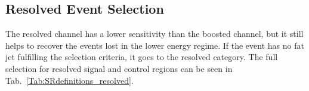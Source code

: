 \subsection{Resolved Event Selection}
The resolved channel has a lower sensitivity than the boosted channel, but it still helps to recover the events lost in the lower energy regime. If the event has no fat jet fulfilling the selection criteria, it goes to the resolved category. The full selection for resolved signal and control regions can be seen in Tab.~\ref{Tab:SRdefinitions_resolved}. 
\begin{table}[t]
	\caption{Summary of the selection criteria of the resolved analysis for the $WW$ and $WZ$ signal regions (SR), $W$+jets control region (WR) and $ t\bar{t}$ control region (TR). } \label{Tab:SRdefinitions_resolved}
	\begin{center}
\end{center}
\end{table}
